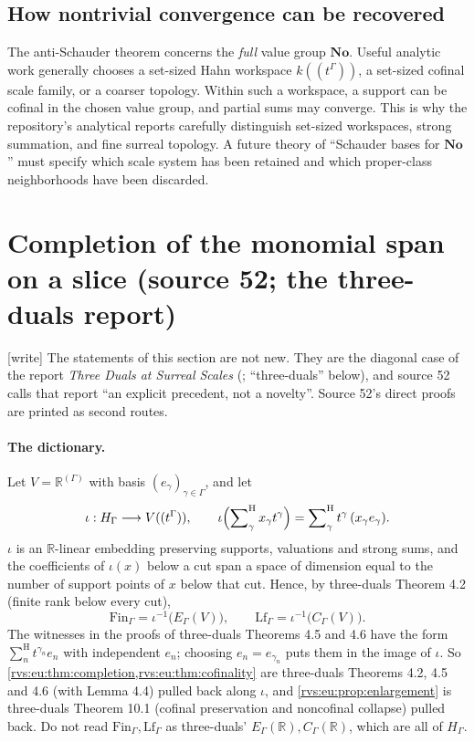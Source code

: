 \documentclass[11pt,letterpaper]{article}
\numberwithin{equation}{section}
\theoremstyle{definition}
\theoremstyle{remark}
\newcommand{\No}{\mathbf{No}}
\newcommand{\R}{\mathbb{R}}
\newcommand{\sH}{\mathop{\sum}\nolimits^{\mathrm H}}
\newcommand{\hSum}{\mathop{\sum}\nolimits^{\mathrm H}}
\newcommand{\FinS}[1]{\mathrm{Fin}_{#1}}%
\newcommand{\LfS}[1]{\mathrm{Lf}_{#1}}%
\newcommand{\wtag}{\textup{[write]}}%
\begin{document}
\subsection{How nontrivial convergence can be recovered}

The anti-Schauder theorem concerns the \emph{full} value group \(\No\).
Useful analytic work generally chooses a set-sized Hahn workspace
\(k((t^\Gamma))\), a set-sized cofinal scale family, or a coarser topology.
Within such a workspace, a support can be cofinal in the chosen value group,
and partial sums may converge.  This is why the repository's analytical
reports carefully distinguish set-sized workspaces, strong summation, and
fine surreal topology.  A future theory of ``Schauder bases for \(\No\)''
must specify which scale system has been retained and which proper-class
neighborhoods have been discarded.

\section{Completion of the monomial span on a slice (source 52; the three-duals report)}\label{rvs:w:sec:completion}\label{rvs:eu:sec:topology}

\wtag{} The statements of this section are not new.  They are the diagonal
case of the report \emph{Three Duals at Surreal Scales}
(; ``three-duals''
below), and source 52 calls that report ``an explicit precedent, not a
novelty''.  Source 52's direct proofs are printed as second routes.

\paragraph{The dictionary.}  Let \(V=\R^{(\Gamma)}\) with basis
\((e_\gamma)_{\gamma\in\Gamma}\), and let
\[
 \iota:H_\Gamma\longrightarrow V((t^\Gamma)),\qquad
 \iota\Bigl(\hSum_\gamma x_\gamma t^\gamma\Bigr)=\hSum_\gamma t^\gamma\,(x_\gamma e_\gamma).
\]
\(\iota\) is an \(\R\)-linear embedding preserving supports, valuations and
strong sums, and the coefficients of \(\iota(x)\) below a cut span a space
of dimension equal to the number of support points of \(x\) below that cut.
Hence, by three-duals Theorem 4.2 (finite rank below every cut),
\[
 \FinS\Gamma=\iota^{-1}\bigl(E_\Gamma(V)\bigr),\qquad
 \LfS\Gamma=\iota^{-1}\bigl(C_\Gamma(V)\bigr).
\]
The witnesses in the proofs of three-duals Theorems 4.5 and 4.6 have the
form \(\sH_n t^{\gamma_n}e_n\) with independent \(e_n\); choosing
\(e_n=e_{\gamma_n}\) puts them in the image of \(\iota\).  So
\cref{rvs:eu:thm:completion,rvs:eu:thm:cofinality} are three-duals
Theorems 4.2, 4.5 and 4.6 (with Lemma 4.4) pulled back along \(\iota\), and
\cref{rvs:eu:prop:enlargement} is three-duals Theorem 10.1 (cofinal
preservation and noncofinal collapse) pulled back.  Do not read
\(\FinS\Gamma,\LfS\Gamma\) as three-duals' \(E_\Gamma(\R),C_\Gamma(\R)\), which are
all of \(H_\Gamma\).
\end{document}
